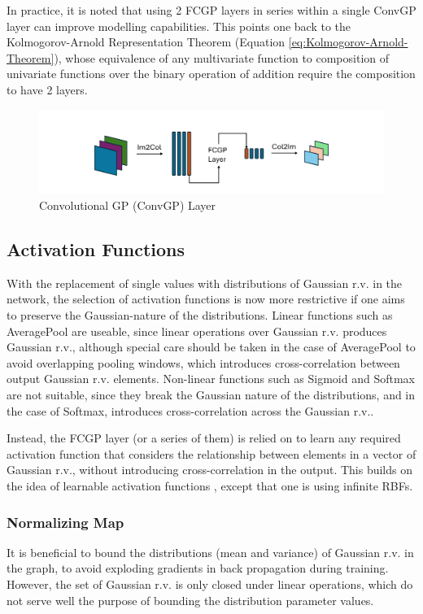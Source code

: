 \documentclass{article}
\begin{document}
In practice, it is noted that using 2 FCGP layers in series within a single ConvGP layer can improve modelling capabilities. This points one back to the Kolmogorov-Arnold Representation Theorem (Equation \ref{eq:Kolmogorov-Arnold-Theorem}), whose equivalence of any multivariate function to composition of univariate functions over the binary operation of addition require the composition to have 2 layers.

\begin{figure}[t]
    \centering
    \includegraphics[width=0.9\columnwidth]{Convolutional_GP.pdf}
    \caption{Convolutional GP (ConvGP) Layer}
    \label{fig:Convolutional_GP}
\end{figure}

\subsection{Activation Functions}
With the replacement of single values with distributions of Gaussian r.v. in the network, the selection of activation functions is now more restrictive if one aims to preserve the Gaussian-nature of the distributions. Linear functions such as AveragePool \cite{poolingmethods} are useable, since linear operations over Gaussian r.v. produces Gaussian r.v., although special care should be taken in the case of AveragePool to avoid overlapping pooling windows, which introduces cross-correlation between output Gaussian r.v. elements. Non-linear functions such as Sigmoid and Softmax are not suitable, since they break the Gaussian nature of the distributions, and in the case of Softmax, introduces cross-correlation across the Gaussian r.v..

Instead, the FCGP layer (or a series of them) is relied on to learn any required activation function that considers the relationship between elements in a vector of Gaussian r.v., without introducing cross-correlation in the output. This builds on the idea of learnable activation functions \cite{learnableActivations}, except that one is using infinite RBFs.

\subsubsection{Normalizing Map}
It is beneficial to bound the distributions (mean and variance) of Gaussian r.v. in the graph, to avoid exploding gradients in back propagation during training. However, the set of Gaussian r.v. is only closed under linear operations, which do not serve well the purpose of bounding the distribution parameter values.
\end{document}

